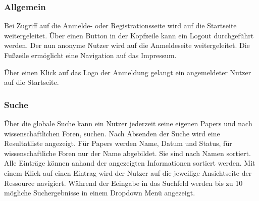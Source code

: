 \subsubsection{Allgemein}
\begin{description}
     Bei Zugriff auf die Anmelde- oder Registrationsseite
    wird auf die Startseite weitergeleitet.
     Über einen Button in der Kopfzeile kann ein Logout durchgeführt werden.
    Der nun anonyme Nutzer wird auf die Anmeldeseite weitergeleitet.
     Die Fußzeile ermöglicht eine Navigation auf das Impressum.

     Über einen Klick auf das Logo der Anmeldung gelangt ein angemeldeter Nutzer auf die
    Startseite.
\end{description}

\subsubsection{Suche}
\begin{description}
     Über die globale Suche kann ein Nutzer jederzeit seine eigenen Papers und nach wissenschaftlichen Foren,
    suchen. Nach Absenden der Suche wird eine Resultatliste angezeigt. Für Papers werden Name, Datum und Status, für
    wissenschaftliche Foren nur der Name abgebildet. %
    Sie sind nach Namen sortiert.
     Alle Einträge können anhand der angezeigten Informationen sortiert werden.
    Mit einem Klick auf einen Eintrag wird der Nutzer auf die jeweilige Ansichtseite
    der Ressource navigiert.
     Während der Eeingabe in das Suchfeld werden bis zu 10 mögliche Suchergebnisse in
    einem Dropdown Menü angezeigt.
\end{description}

